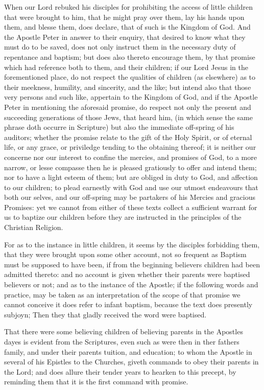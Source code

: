\documentclass[12pt,a4paper]{book}
\begin{document}
When our Lord rebuked his disciples for prohibiting the access of little children that were brought to him, that he might pray over them, lay his hands upon them, and blesse them, does declare, that of such is the Kingdom of God. And the Apostle Peter in answer to their enquiry, that desired to know what they must do to be saved, does not only instruct them in the necessary duty of repentance and baptism; but does also thereto encourage them, by that promise which had reference both to them, and their children; if our Lord Jesus in the forementioned place, do not respect the qualities of children (as elsewhere) as to their meekness, humility, and sincerity, and the like; but intend also that those very persons and such like, appertain to the Kingdom of God, and if the Apostle Peter in mentioning the aforesaid promise, do respect not only the present and succeeding generations of those Jews, that heard him, (in which sense the same phrase doth occurre in Scripture) but also the immediate off-spring of his auditors; whether the promise relate to the gift of the Holy Spirit, or of eternal life, or any grace, or priviledge tending to the obtaining thereof; it is neither our concerne nor our interest to confine the mercies, and promises of God, to a more narrow, or lesse compasse then he is pleased gratiously to offer and intend them; nor to have a light esteem of them; but are obliged in duty to God, and affection to our children; to plead earnestly with God and use our utmost endeavours that both our selves, and our off-spring may be partakers of his Mercies and gracious Promises: yet we cannot from either of these texts collect a sufficient warrant for us to baptize our children before they are instructed in the principles of the Christian Religion.

For as to the instance in little children, it seems by the disciples forbidding them, that they were brought upon some other account, not so frequent as Baptism must be supposed to have been, if from the beginning believers children had been admitted thereto: and no account is given whether their parents were baptised believers or not; and as to the instance of the Apostle; if the following words and practice, may be taken as an interpretation of the scope of that promise we cannot conceive it does refer to infant baptism, because the text does presently subjoyn; Then they that gladly received the word were baptised.

That there were some believing children of believing parents in the Apostles dayes is evident from the Scriptures, even such as were then in ther fathers family, and under their parents tuition, and education; to whom the Apostle in several of his Epistles to the Churches, giveth commands to obey their parents in the Lord; and does allure their tender years to hearken to this precept, by reminding them that it is the first command with promise.
\end{document}
